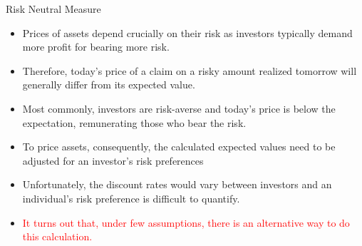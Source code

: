 \documentclass{beamer}
\begin{document}

\begin{frame}{Risk Neutral Measure}
	\begin{itemize}
	\item<1-> Prices of assets depend crucially on their risk as investors typically demand more profit for bearing more risk. \item<2-> Therefore, today's price of a claim on a risky amount realized tomorrow will generally differ from its expected value. \item<3-> Most commonly, investors are risk-averse and today's price is below the expectation, remunerating those who bear the risk.
	\item<4-> To price assets, consequently, the calculated expected values need to be adjusted for an investor's risk preferences \item<5-> Unfortunately, the discount rates would vary between investors and an individual's risk preference is difficult to quantify.
	\item<6-> \textcolor{red}{It turns out that, under few assumptions, there is an alternative way to do this calculation.}
	\end{itemize}
\end{frame}
\end{document}
